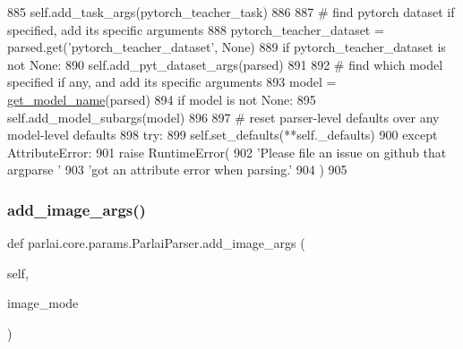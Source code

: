 \begin{DoxyCode}
885             self.add\_task\_args(pytorch\_teacher\_task)
886 
887         \textcolor{comment}{# find pytorch dataset if specified, add its specific arguments}
888         pytorch\_teacher\_dataset = parsed.get(\textcolor{stringliteral}{'pytorch\_teacher\_dataset'}, \textcolor{keywordtype}{None})
889         \textcolor{keywordflow}{if} pytorch\_teacher\_dataset \textcolor{keywordflow}{is} \textcolor{keywordflow}{not} \textcolor{keywordtype}{None}:
890             self.add\_pyt\_dataset\_args(parsed)
891 
892         \textcolor{comment}{# find which model specified if any, and add its specific arguments}
893         model = \hyperlink{namespaceparlai_1_1core_1_1params_a6d160324f6af84562334fd0698141074}{get\_model\_name}(parsed)
894         \textcolor{keywordflow}{if} model \textcolor{keywordflow}{is} \textcolor{keywordflow}{not} \textcolor{keywordtype}{None}:
895             self.add\_model\_subargs(model)
896 
897         \textcolor{comment}{# reset parser-level defaults over any model-level defaults}
898         \textcolor{keywordflow}{try}:
899             self.set\_defaults(**self.\_defaults)
900         \textcolor{keywordflow}{except} AttributeError:
901             \textcolor{keywordflow}{raise} RuntimeError(
902                 \textcolor{stringliteral}{'Please file an issue on github that argparse '}
903                 \textcolor{stringliteral}{'got an attribute error when parsing.'}
904             )
905 
\end{DoxyCode}
\mbox{\label{classparlai_1_1core_1_1params_1_1ParlaiParser_a33d186a0cd665df88726b96f1bc3d88e}} 
\subsubsection{\texorpdfstring{add\+\_\+image\+\_\+args()}{add\_image\_args()}}
{\footnotesize\ttfamily def parlai.\+core.\+params.\+Parlai\+Parser.\+add\+\_\+image\+\_\+args (\begin{DoxyParamCaption}\item[{}]{self,  }\item[{}]{image\+\_\+mode }\end{DoxyParamCaption})}

